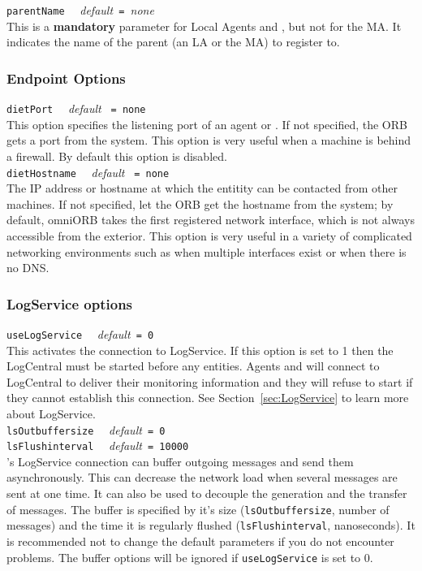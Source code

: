 \noindent
\texttt{parentName} \ \ \emph{default}\texttt{ = }\emph{none}\\ This is a
\textbf{mandatory} parameter for Local Agents and \seds, but not for the MA.
It indicates the name of the parent (an LA or the MA) to register to.

\subsubsection{Endpoint Options}

\noindent
\texttt{dietPort} \ \ \emph{default} \texttt{ = none }\\ This option specifies
the listening port of an agent or \sed. If not specified, the ORB gets a port
from the system. This option is very useful when a machine is behind a
firewall. By default this option is disabled.\\

\noindent
\texttt{dietHostname} \ \ \emph{default} \texttt{ = none }\\ The IP address or
hostname at which the entitity can be contacted from other machines. If not
specified, let the ORB get the hostname from the system; by default, omniORB
takes the first registered network interface, which is not always accessible
from the exterior.  This option is very useful in a variety of complicated
networking environments such as when multiple interfaces exist or when there is
no DNS.

\subsubsection{LogService options}

\noindent
\texttt{useLogService} \ \ \emph{default}\texttt{ = 0}\\ This activates the
connection to LogService. If this option is set to 1 then the LogCentral must
be started before any \diet entities. Agents and \seds will connect to
LogCentral to deliver their monitoring information and they will refuse to
start if they cannot establish this connection. See
Section~\ref{sec:LogService} to learn more about LogService.\\

\noindent
\texttt{lsOutbuffersize} \ \ \emph{default}\texttt{ = 0}\\
\noindent
\texttt{lsFlushinterval} \ \ \emph{default}\texttt{ = 10000}\\ \diet's
LogService connection can buffer outgoing messages and send them
asynchronously. This can decrease the network load when several messages are
sent at one time. It can also be used to decouple the generation and the
transfer of messages. The buffer is specified by it's size
(\texttt{lsOutbuffersize}, number of messages) and the time it is regularly
flushed (\texttt{lsFlushinterval}, nanoseconds). It is recommended not to
change the default parameters if you do not encounter problems. The buffer
options will be ignored if \texttt{useLogService} is set to 0.

